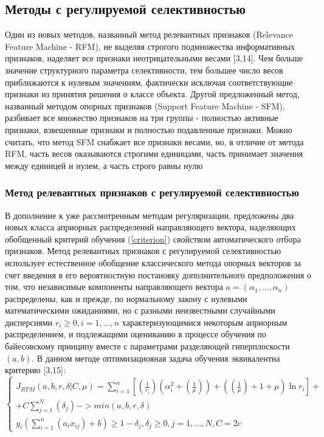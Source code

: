 \documentclass[../body.tex]{subfiles}
\begin{document}
\subsection{Методы с регулируемой селективностью }
Один из новых методов, названный метод релевантных признаков (Relevance Feature Machine - RFM), не выделяя строгого подмножества информативных признаков, наделяет все признаки неотрицательными весами [3,14]. Чем больше значение структурного параметра селективности, тем большее число весов приближаются к нулевым значениям, фактически исключая соответствующие признаки из принятия решения о классе объекта.
	Другой предложенный метод, названный методом опорных признаков (Support Feature
	Machine - SFM), разбивает все множество признаков на три группы - полиостью активные
	признаки, взвешенные признаки и полностью подавленные признаки. Можно считать, что
	метод SFM снабжает все признаки весами, но, в отличие от метода RFM, часть весов оказываются строгими единицами, часть принимает значения между единицей и нулем, а
	часть строго равны нулю
\subsubsection{Метод релевантных признаков с регулируемой селективностью }
В дополнение к уже рассмотренным методам регуляризации,
предложены два новых класса априорных распределений направляющего вектора, наделяющих обобщенный критерий обучения (\ref{criterion}) свойством автоматического отбора признаков.
Метод релевантных признаков с регулируемой селективностью использует естественное обобщение классического метода опорных векторов за счет введения в его вероятностную постановку дополнительного предположения о том, что независимые компоненты направляющего вектора $a=(\alpha_1, ..., \alpha_n)$ распределены, как и прежде, по нормальному закону с нулевыми математическими ожиданиями, но с разными неизвестными случайными дисперсиями $r_i \geq 0, i = 1,...,n$ характеризующимися некоторым априорным распределением, и подлежащими оцениванию в процессе обучения по байесовскому принципу вместе с параметрами разделяющей гиперплоскости $(a,b)$. 
В данном методе оптимизациояная задача обучения эквивалентна
критерию [3,15]:
$$\left\{\begin{matrix}
	J_{RFM}(a, b, r, \delta |C,\mu) = \sum_{i=1}^{n}[(\frac{1}{r_i})(\alpha_i^2 +(\frac{1}{\mu}))+((\frac{1}{\mu})+1+\mu)\ln{r_i}] +\\ +C\sum_{j=1}^{N}(\delta_j)->min(a,b,r,\delta)
	\\
	y_i(\sum_{i=1}^{n}(a_ix_{ij})+b)\geq1-\delta_j, \delta_j \geq 0, j= 1,...,N, C=2c
\end{matrix}\right.$$
\end{document}
